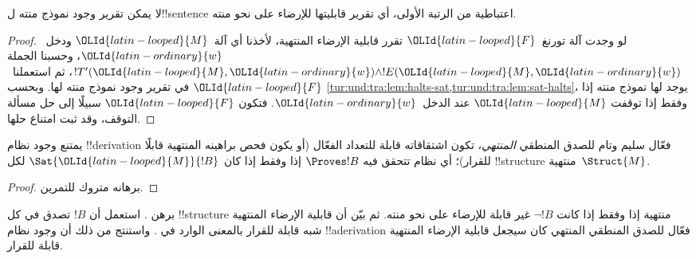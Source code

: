 \documentclass[../../../include/open-logic-section]{subfiles}
\begin{document}
\begin{thm}
  لا يمكن تقرير وجود نموذج منته ل!!{sentence} اعتباطية من
  الرتبة الأولى، أي تقرير قابليتها للإرضاء على نحو منته.
\end{thm}

\begin{proof}
  لو وجدت آلة تورنغ~${\OLId{latin-looped}{F}}$ تقرر قابلية الإرضاء المنتهية،
  لأخذنا أي آلة~${\OLId{latin-looped}{M}}$ ودخل~${\OLId{latin-ordinary}{w}}$، وحسبنا الجملة
  $!T'({\OLId{latin-looped}{M}},{\OLId{latin-ordinary}{w}})\land !E({\OLId{latin-looped}{M}},{\OLId{latin-ordinary}{w}})$، ثم استعملنا~${\OLId{latin-looped}{F}}$ في تقرير
  وجود نموذج منته لها. وبحسب
  \cref{tur:und:tra:lem:halts-sat,tur:und:tra:lem:sat-halts}،
  يوجد لها نموذج منته إذا وفقط إذا توقفت ${\OLId{latin-looped}{M}}$ عند
  الدخل~${\OLId{latin-ordinary}{w}}$. فتكون ${\OLId{latin-looped}{F}}$ سبيلًا إلى حل مسألة التوقف،
  وقد ثبت امتناع حلها.
\end{proof}

\begin{cor}%
  يمتنع وجود نظام !!{derivation} فعّال سليم وتام للصدق المنطقي
  \emph{المنتهي}، تكون اشتقاقاته قابلة للتعداد الفعّال (أو يكون فحص
  براهينه المنتهية قابلًا للقرار)؛ أي نظام تتحقق فيه $\Proves !B$ إذا وفقط
  إذا كان $\Sat{{\OLId{latin-looped}{M}}}{!B}$ لكل !!{structure} منتهية~$\Struct{M}$.
\end{cor}

\begin{proof}
  برهانه متروك للتمرين.
\end{proof}

\begin{prob}
  برهن . استعمل أن
  $!B$ تصدق في كل !!{structure} منتهية إذا وفقط إذا كانت
  $\lnot !B$ غير قابلة للإرضاء على نحو منته. ثم بيّن أن
  قابلية الإرضاء المنتهية شبه قابلة للقرار بالمعنى الوارد في
  . واستنتج من ذلك أن
  وجود نظام !!a{derivation} فعّال للصدق المنطقي المنتهي كان
  سيجعل قابلية الإرضاء المنتهية قابلة للقرار.
\end{prob}
\end{document}
